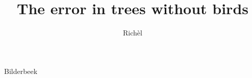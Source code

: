 \documentclass[]{dissertation}
\begin{document}
\title{The error in trees without birds}
\author{Rich\`el}{Bilderbeek}

\frontmatter




\tableofcontents



%

\mainmatter

\thumbtrue


% 




%

%

\appendix

%

\thumbfalse

% 
% 
\end{document}

